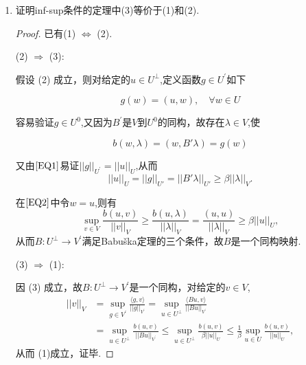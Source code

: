 \documentclass[12pt,a4paper]{article}
\begin{document}
\begin{enumerate}
		\begin{proof}
			在$-\Delta\mathbf{u}+\nabla p=\mathbf{f}$中，对$\forall \mathbf{v} \in (H_0^1(\Omega))^2$有
			
			$$\int_\Omega -\Delta \mathbf{u} \cdot \mathbf{v} + \nabla p \mathbf{v} dx = \int_{\Omega} \mathbf{f} \mathbf{v} dx$$
			
			利用两次Green公式和$\mathbf{v}|_{\partial\Omega}=\frac{\partial \mathbf{v}}{\partial \mathbf{n}}|_{\partial\Omega}=0$以及散度积分公式可得
			
			$$\int_\Omega \nabla \mathbf{u} : \nabla \mathbf{v} + div\mathbf{v} p  dx = \int_{\Omega} \mathbf{f} \mathbf{v} dx$$
			
			在$div\mathbf{u}=0$中，对$\forall q \in L_0^2(\Omega)$，有
			
			$$\int_{\Omega} div\mathbf{u} q dx = 0$$
			
			得到混合变分形式.
		\end{proof}
		\item 证明inf-sup条件的定理中(3)等价于(1)和(2). 
		
		\begin{proof}
			已有(1) $\Leftrightarrow$ (2).
			
			(2) $\Rightarrow$ (3):
			
			假设 (2) 成立，则对给定的$u\in U^\perp$,定义函数$g\in U^\prime$如下
			
			
			\begin{equation}\tag{$\ast$} \label{EQ1}
				g(w)=(u,w),\quad\forall w\in U
			\end{equation}
			
			容易验证$g\in U^0$,又因为$B^\prime$是$V$到$U^0$的同构，故存在$\lambda\in V$,使
			
			\begin{equation}\tag{$\star$} \label{EQ2}
				b(w,\lambda)=(w,B'\lambda)=g(w)
			\end{equation}
			
			又由$\eqref{EQ1}$易证$||g||_{U^{\prime}}=||u||_{U}$,从而
			$$||u||_U=||g||_{U'}=||B'\lambda||_{U'}\geq\beta||\lambda||_V.$$
			
			在$\eqref{EQ2}$中令$w=u$,则有
			$$\sup\limits_{v\in V}\frac{b(u,v)}{||v||_V}\geq\frac{b(u,\lambda)}{||\lambda||_V}=\frac{(u,u)}{||\lambda||_V}\geq\beta||u||_U,$$
			从而$B:U^{\perp}\to V^{\prime}$满足Babuška定理的三个条件，故$B$是一个同构映射.
			
			(3) $\Rightarrow$ (1):
			
			因 (3) 成立，故$B:U^\perp\to V^{\prime}$是一个同构，对给定的$v\in V$,
			$$\begin{aligned}||v||_{V}&=\sup_{g\in V^{\prime}}\frac{\langle g,v\rangle}{||g||_{V^{\prime}}}=\sup_{u\in U^{\perp}}\frac{\langle Bu,v\rangle}{||Bu||_{V^{\prime}}}\\&=\sup_{u\in U^{\perp}}\frac{b(u,v)}{||Bu||_{V^{\prime}}}\leq\sup_{u\in U^{\perp}}\frac{b(u,v)}{\beta||u||_{U}}\leq\frac{1}{\beta}\sup_{u\in U}\frac{b(u,v)}{||u||_{U}},\end{aligned}$$
			从而 (1)成立，证毕.
			

\end{proof}
\end{enumerate}
\end{document}
